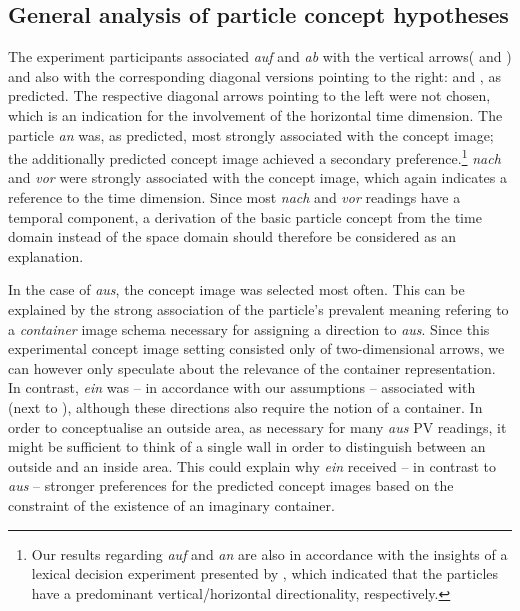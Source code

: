 \documentclass[output=paper]{langsci/langscibook}
\begin{document}
\subsection{General analysis of particle concept hypotheses}
\label{sec:disc-general}

The experiment participants associated \textit{auf} and \textit{ab}
with the vertical arrows\linebreak ( and ) and
also with the corresponding diagonal versions pointing to the right:
 and , as predicted. The
respective diagonal arrows pointing to the left were not chosen, which
is an indication for the involvement of the horizontal time dimension.
%
The particle \textit{an} was, as predicted, most strongly associated
with the  concept image; the additionally predicted
 concept image achieved a secondary preference.\footnote{Our
  results regarding \textit{auf} and \textit{an} are also in
  accordance with the insights of a lexical decision experiment
  presented by \cite{FrassinelliEtAl:17}, which indicated that the
  particles have a predominant vertical/horizontal directionality,
  respectively.}
%
\textit{nach} and \textit{vor} were strongly associated with the
 concept image, which again indicates a reference to the time
dimension. Since most \textit{nach} and \textit{vor} readings have a
temporal component, a derivation of the basic particle concept from
the time domain instead of the space domain should therefore be
considered as an explanation.

In the case of \textit{aus}, the  concept image was selected
most often. This can be explained by the strong association of the
particle's prevalent meaning refering to a \textit{container} image
schema necessary for assigning a direction to \textit{aus}. Since this
experimental concept image setting consisted only of two-dimensional arrows, we
can however only speculate about the relevance of the container
representation. In contrast, \textit{ein} was -- in accordance with our
assumptions -- associated with  (next to
), although these directions also require the notion
of a container. In order to conceptualise an outside area, as
necessary for many \textit{aus} PV readings, it might be sufficient to
think of a single wall in order to distinguish between an outside and
an inside area. This could explain why \textit{ein} received -- in
contrast to \textit{aus} -- stronger preferences for the predicted concept images
based on the constraint of the existence of an imaginary container.
\end{document}
